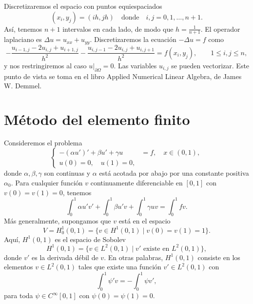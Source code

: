 \documentclass[11pt,letterpaper]{report}
\begin{document}
Discretizaremos el espacio con puntos equiespaciados
\begin{equation}
  (x_i,y_j)=(ih,jh) \quad \text{donde} \quad i,j=0,1,\dots,n+1
.\end{equation}
Así, tenemos $n+1$ intervalos en cada lado, de modo que
$h=\frac{1}{n+1}$.
El operador laplaciano es $\Delta u = u_{xx}+u_{yy}$. Discretizaremos
la ecuación $-\Delta u = f$ como
\begin{equation}
  -\frac{u_{i-1,j} - 2u_{i,j} + u_{i+1,j}}{h^{2}}
  -\frac{u_{i,j-1} - 2u_{i,j} + u_{i,j+1}}{h^{2}}
  =
  f(x_i,y_j),
  \qquad
  1\leq i,j\leq n
,\end{equation}
y nos restringiremos al caso $u|_{\partial\Omega}=0$.
Las variables $u_{i,j}$ se pueden vectorizar. Este punto de vista se
toma en el libro Applied Numerical Linear Algebra, de James W.
Demmel.

\section{Método del elemento finito}

Consideremos el problema
\begin{equation}
  \left\{
    \begin{aligned}
      -(\alpha u')' + \beta u' + \gamma u &= f, \quad x\in (0,1),
      \\
      u(0) = 0, \quad u(1) = 0, &
    \end{aligned}
  \right.
\end{equation}
donde $\alpha,\beta,\gamma$ son continuas y $\alpha$ está acotada por
abajo por una constante positiva $\alpha_0$.
Para cualquier función $v$ continuamente diferenciable en $[0,1]$ con
$v(0)=v(1)=0$, tenemos
\begin{equation}
       \int_0^{1} \alpha u'v' + \int_0^{1} \beta u'v + \int_0^{1} \gamma u v
      = \int_0^{1} fv
.\end{equation}
Más generalmente, supongamos que $v$ está en el espacio
\begin{equation}
  V
  = H^{1}_0(0,1)
  = \{ v \in H^{1}(0,1) \mid v(0)=v(1)=1 \}.
\end{equation}
Aquí, $H^{1}(0,1)$ es el espacio de Sobolev
\begin{equation}
  H^{1}(0,1)
  =
  \{v\in L^{2}(0,1) \mid v' \text{ existe en } L^{2}(0,1) \}
,\end{equation}
donde $v'$ es la derivada débil de $v$. En otras palabras,
$H^{1}(0,1)$ consiste en los elementos $v\in L^{2}(0,1)$ tales que
existe una función $v'\in L^{2}(0,1)$ con
\begin{equation}
    \int_{0}^{1} \psi' v
    =
    - \int_{0}^{1} \psi v'
,\end{equation}
para toda $\psi\in C^{\infty}[0,1]$ con $\psi(0)=\psi(1)=0$.
\end{document}
